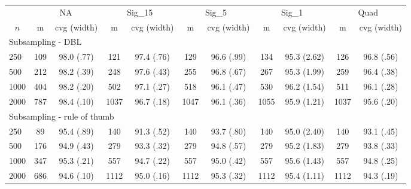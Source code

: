 \begin{tabular}{lcccccccccc}
   \toprule
 
           & \multicolumn{2}{c}{NA}& \multicolumn{2}{c}{Sig\_15}& \multicolumn{2}{c}{Sig\_5}& \multicolumn{2}{c}{Sig\_1}& \multicolumn{2}{c}{Quad} \\ 
             \cmidrule(l{2pt}r{2pt}){2-3} \cmidrule(l{2pt}r{2pt}){4-5} \cmidrule(l{2pt}r{2pt}){6-7} 
             \multicolumn{1}{c}{$n$} & \multicolumn{1}{c}{m}& \multicolumn{1}{c}{cvg (width)}& \multicolumn{1}{c}{m}& \multicolumn{1}{c}{cvg (width)}& \multicolumn{1}{c}{m}& \multicolumn{1}{c}{cvg (width)}& \multicolumn{1}{c}{m}& \multicolumn{1}{c}{cvg (width)}& \multicolumn{1}{c}{m}& \multicolumn{1}{c}{cvg (width)} \\  
             \hline   
 \multicolumn{7}{l}{Subsampling - DBL} \\ 
250 & 109 & 98.0 (.77) & 121 & 97.4 (.76) & 129 & 96.6 (.99) & 134 & 95.3 (2.62) & 126 & 96.8 (.56) \\ 
  500 & 212 & 98.2 (.39) & 248 & 97.6 (.43) & 255 & 96.8 (.67) & 267 & 95.3 (1.99) & 259 & 96.4 (.38) \\ 
  1000 & 404 & 98.2 (.20) & 502 & 97.1 (.27) & 518 & 96.1 (.47) & 530 & 96.2 (1.54) & 511 & 96.1 (.28) \\ 
  2000 & 787 & 98.4 (.10) & 1037 & 96.7 (.18) & 1047 & 96.1 (.36) & 1055 & 95.9 (1.21) & 1037 & 95.6 (.20) \\ 
       \hline   
 \multicolumn{7}{l}{Subsampling - rule of thumb} \\ 
250 & 89 & 95.4 (.89) & 140 & 91.3 (.52) & 140 & 93.7 (.80) & 140 & 95.0 (2.40) & 140 & 93.1 (.45) \\ 
  500 & 176 & 94.9 (.43) & 279 & 93.3 (.32) & 279 & 94.8 (.57) & 279 & 95.2 (1.83) & 279 & 93.8 (.33) \\ 
  1000 & 347 & 95.3 (.21) & 557 & 94.7 (.22) & 557 & 95.0 (.42) & 557 & 95.6 (1.43) & 557 & 94.8 (.25) \\ 
  2000 & 686 & 94.6 (.10) & 1112 & 95.0 (.16) & 1112 & 95.3 (.32) & 1112 & 95.4 (1.11) & 1112 & 94.3 (.19) \\ 
   \hline
\end{tabular}
